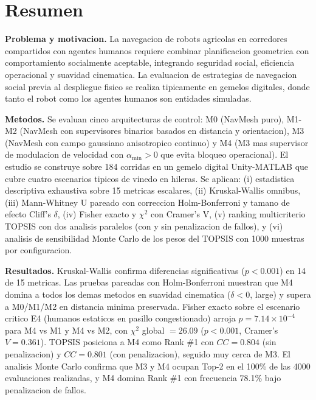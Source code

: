 \documentclass[12pt,a4paper,oneside]{book}
\begin{document}
\thispagestyle{plain}
\chapter*{Resumen}

\noindent
\textbf{Problema y motivacion.} La navegacion de robots agricolas en corredores compartidos con agentes humanos requiere combinar planificacion geometrica con comportamiento socialmente aceptable, integrando seguridad social, eficiencia operacional y suavidad cinematica. La evaluacion de estrategias de navegacion social previa al despliegue fisico se realiza tipicamente en gemelos digitales, donde tanto el robot como los agentes humanos son entidades simuladas.

\noindent
\textbf{Metodos.} Se evaluan cinco arquitecturas de control: M0 (NavMesh puro), M1-M2 (NavMesh con supervisores binarios basados en distancia y orientacion), M3 (NavMesh con campo gaussiano anisotropico continuo) y M4 (M3 mas supervisor de modulacion de velocidad con $\alpha_{\min} > 0$ que evita bloqueo operacional). El estudio se construye sobre 184 corridas en un gemelo digital Unity-MATLAB que cubre cuatro escenarios tipicos de vinedo en hileras. Se aplican: (i) estadistica descriptiva exhaustiva sobre 15 metricas escalares, (ii) Kruskal-Wallis omnibus, (iii) Mann-Whitney U pareado con correccion Holm-Bonferroni y tamano de efecto Cliff's $\delta$, (iv) Fisher exacto y $\chi^2$ con Cramer's V, (v) ranking multicriterio TOPSIS con dos analisis paralelos (con y sin penalizacion de fallos), y (vi) analisis de sensibilidad Monte Carlo de los pesos del TOPSIS con 1000 muestras por configuracion.

\noindent
\textbf{Resultados.} Kruskal-Wallis confirma diferencias significativas ($p<0.001$) en 14 de 15 metricas. Las pruebas pareadas con Holm-Bonferroni muestran que M4 domina a todos los demas metodos en suavidad cinematica ($\delta < 0$, large) y supera a M0/M1/M2 en distancia minima preservada. Fisher exacto sobre el escenario critico E4 (humanos estaticos en pasillo congestionado) arroja $p = 7.14 \times 10^{-4}$ para M4 vs M1 y M4 vs M2, con $\chi^2$ global $= 26.09$ ($p<0.001$, Cramer's $V = 0.361$). TOPSIS posiciona a M4 como Rank \#1 con $CC = 0.804$ (sin penalizacion) y $CC = 0.801$ (con penalizacion), seguido muy cerca de M3. El analisis Monte Carlo confirma que M3 y M4 ocupan Top-2 en el 100\% de las 4000 evaluaciones realizadas, y M4 domina Rank \#1 con frecuencia 78.1\% bajo penalizacion de fallos.
\end{document}
